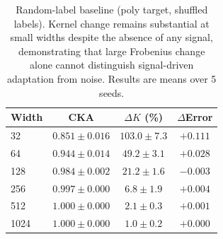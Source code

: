 \documentclass[twoside,11pt]{article}
\begin{document}
\begin{table}[h!]  %
    \centering\footnotesize
        \caption{Random-label baseline (poly target, shuffled labels).  Kernel change remains substantial at small widths despite the absence of any signal, demonstrating that large Frobenius change alone cannot distinguish signal-driven adaptation from noise.  Results are means over 5 seeds.}
    \label{tab:random_label}
    \begin{tabular}{lccc}
    \toprule
    Width & CKA & $\Delta K$ (\%) & $\Delta$Error \\
    \midrule
    32   & $0.851\pm0.016$ & $103.0\pm7.3$   & $+0.111$ \\
    64   & $0.944\pm0.014$ & $49.2\pm3.1$    & $+0.028$ \\
    128  & $0.984\pm0.002$ & $21.2\pm1.6$    & $-0.003$ \\
    256  & $0.997\pm0.000$ & $6.8\pm1.9$     & $+0.004$ \\
    512  & $1.000\pm0.000$ & $2.1\pm0.3$     & $+0.001$ \\
    1024 & $1.000\pm0.000$ & $1.0\pm0.2$     & $+0.000$ \\
    \bottomrule
    \end{tabular}
\end{table}
\end{document}
